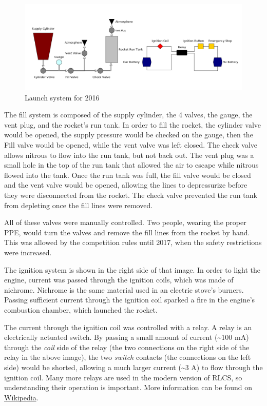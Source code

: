 \documentclass[11pt]{article}
\begin{document}
\begin{figure}[htbp]
\centering
\includegraphics[width=.9\linewidth]{./images/old_system.png}
\caption{\label{fig:org18a0954}
Launch system for 2016}
\end{figure}

The fill system is composed of the supply cylinder, the 4 valves, the gauge, the
vent plug, and the rocket's run tank. In order to fill the rocket, the cylinder
valve would be opened, the supply pressure would be checked on the gauge, then
the Fill valve would be opened, while the vent valve was left closed. The check
valve allows nitrous to flow into the run tank, but not back out. The vent plug
was a small hole in the top of the run tank that allowed the air to escape while
nitrous flowed into the tank. Once the run tank was full, the fill valve would
be closed and the vent valve would be opened, allowing the lines to depressurize
before they were disconnected from the rocket. The check valve prevented the run
tank from depleting once the fill lines were removed.

All of these valves were manually controlled. Two people, wearing the proper
PPE, would turn the valves and remove the fill lines from the rocket by
hand. This was allowed by the competition rules until 2017, when the safety
restrictions were increased.

The ignition system is shown in the right side of that image. In order to light
the engine, current was passed through the ignition coils, which was made of
nichrome. Nichrome is the same material used in an electric stove's
burners. Passing sufficient current through the ignition coil sparked a fire in
the engine's combustion chamber, which launched the rocket.

The current through the ignition coil was controlled with a relay. A relay is
an electrically actuated switch. By passing a small amount of current (\textasciitilde{}100 mA) through
the \emph{coil} side of the relay (the two connections on the right side of the relay
in the above image), the two \emph{switch} contacts (the connections on the left
side) would be shorted, allowing a much larger current (\textasciitilde{}3 A) to flow through
the ignition coil. Many more relays are used in the modern version of RLCS, so
understanding their operation is important. More information can be found on
\href{https://en.wikipedia.org/wiki/Relay}{Wikipedia}.
\end{document}
